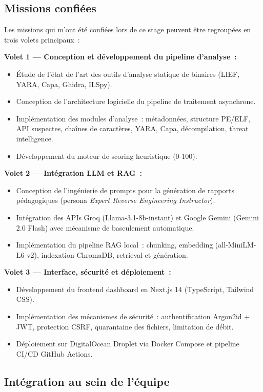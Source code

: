 \subsection{Missions confiées}

Les missions qui m'ont été confiées lors de ce stage peuvent être regroupées en trois volets principaux~:

\textbf{Volet 1 --- Conception et développement du pipeline d'analyse~:}
\begin{itemize}
  \item Étude de l'état de l'art des outils d'analyse statique de binaires (LIEF, YARA, Capa, Ghidra, ILSpy).
  \item Conception de l'architecture logicielle du pipeline de traitement asynchrone.
  \item Implémentation des modules d'analyse~: métadonnées, structure PE/ELF, API suspectes, chaînes de caractères, YARA, Capa, décompilation, threat intelligence.
  \item Développement du moteur de scoring heuristique (0-100).
\end{itemize}

\textbf{Volet 2 --- Intégration LLM et RAG~:}
\begin{itemize}
  \item Conception de l'ingénierie de prompts pour la génération de rapports pédagogiques (persona \textit{Expert Reverse Engineering Instructor}).
  \item Intégration des APIs Groq (Llama-3.1-8b-instant) et Google Gemini (Gemini 2.0 Flash) avec mécanisme de basculement automatique.
  \item Implémentation du pipeline RAG local~: chunking, embedding (all-MiniLM-L6-v2), indexation ChromaDB, retrieval et génération.
\end{itemize}

\textbf{Volet 3 --- Interface, sécurité et déploiement~:}
\begin{itemize}
  \item Développement du frontend dashboard en Next.js 14 (TypeScript, Tailwind CSS).
  \item Implémentation des mécanismes de sécurité~: authentification Argon2id + JWT, protection CSRF, quarantaine des fichiers, limitation de débit.
  \item Déploiement sur DigitalOcean Droplet via Docker Compose et pipeline CI/CD GitHub Actions.
\end{itemize}

\subsection{Intégration au sein de l'équipe}

